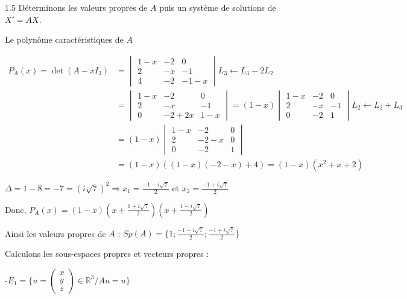 \documentclass[12pt]{article}
\begin{document}
\begin{spacing}{1.5}
 Déterminons les valeurs propres de $A$ puis un système de solutions de $X'=AX$.
 
 Le polynôme caractéristiques de $A$
 
 \begin{align*}
 P_A(x)=\det(A-xI_3) &=\begin{vmatrix}
 1-x & -2 & 0 \\ 
 2 & -x & -1 \\ 
 4 & -2 & -1-x
 \end{vmatrix} L_3\longleftarrow L_3-2L_2\\
 &=\begin{vmatrix}
 1-x & -2 & 0 \\ 
 2 & -x & -1 \\ 
 0 & -2+2x & 1-x
 \end{vmatrix}=(1-x)\begin{vmatrix}
 1-x & -2 & 0 \\ 
 2 & -x & -1 \\ 
 0 & -2 & 1
 \end{vmatrix}L_2\longleftarrow L_2+L_3\\
 &=(1-x)\begin{vmatrix}
 1-x & -2 & 0 \\ 
 2 & -2-x & 0 \\ 
 0 & -2 & 1
 \end{vmatrix}\\
 &=(1-x)((1-x)(-2-x)+4)=(1-x)(x^2+x+2)
 \end{align*}
 
$\Delta=1-8=-7=(i\sqrt{7})^2\Rightarrow x_1=\frac{-1-i\sqrt{7}}{2}$ et $x_2=\frac{-1+i\sqrt{7}}{2}$

Donc, $P_A(x)=(1-x)(x+\frac{1+i\sqrt{7}}{2})(x+\frac{1-i\sqrt{7}}{2})$

Ainsi les valeurs propres de $A$ : $Sp(A)=\{1;\frac{-1-i\sqrt{7}}{2};\frac{-1+i\sqrt{7}}{2}\}$

\medskip
Calculons les sous-espaces propres  et vecteurs propres :

-$E_1=\{u=\begin{pmatrix}
x\\
y\\
z
\end{pmatrix}\in \mathbb{R}^3/Au=u\}$


\end{spacing}
\end{document}
